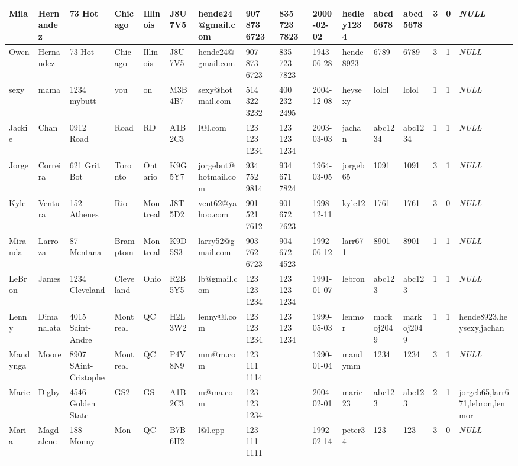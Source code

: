 \begin{longtable}{|l|l|l|l|l|l|l|l|l|l|l|l|l|l|l|l|}
Mila & Hernandez & 73 Hot & Chicago & Illinois & J8U 7V5 & hende24@gmail.com & 907 873 6723 & 835 723 7823 & 2000-02-02 & hedley1234 & abcd5678 & abcd5678 & 3 & 0 & \textit{NULL} \\ \hline 
Owen & Hernandez & 73 Hot & Chicago & Illinois & J8U 7V5 & hende24@gmail.com & 907 873 6723 & 835 723 7823 & 1943-06-28 & hende8923 & 6789 & 6789 & 3 & 1 & \textit{NULL} \\ \hline 
sexy & mama & 1234 mybutt & you & on & M3B 4B7 & sexy@hotmail.com & 514 322 3232 & 400 232 2495 & 2004-12-08 & heysexy & lolol & lolol & 1 & 1 & \textit{NULL} \\ \hline 
Jackie & Chan & 0912 Road & Road & RD & A1B 2C3 & l@l.com & 123 123 1234 & 123 123 1234 & 2003-03-03 & jachan & abc1234 & abc1234 & 1 & 1 & \textit{NULL} \\ \hline 
Jorge & Correira & 621 Grit Bot & Toronto & Ontario & K9G 5Y7 & jorgebut@hotmail.com & 934 752 9814 & 934 671 7824 & 1964-03-05 & jorgeb65 & 1091 & 1091 & 3 & 1 & \textit{NULL} \\ \hline 
Kyle & Ventura & 152 Athenes & Rio & Montreal & J8T 5D2 & vent62@yahoo.com & 901 521 7612 & 901 672 7623 & 1998-12-11 & kyle12 & 1761 & 1761 & 3 & 0 & \textit{NULL} \\ \hline 
Miranda & Larroza & 87 Mentana & Bramptom & Montreal & K9D 5S3 & larry52@gmail.com & 903 762 6723 & 904 672 4523 & 1992-06-12 & larr671 & 8901 & 8901 & 1 & 1 & \textit{NULL} \\ \hline 
LeBron & James & 1234 Cleveland & Cleveland & Ohio & R2B 5Y5 & lb@gmail.com & 123 123 1234 & 123 123 1234 & 1991-01-07 & lebron & abc123 & abc123 & 1 & 1 & \textit{NULL} \\ \hline 
Lenny & Dimanalata & 4015 Saint-Andre & Montreal & QC & H2L 3W2 & lenny@l.com & 123 123 1234 & 123 123 1234 & 1999-05-03 & lenmor & markoj2049 & markoj2049 & 1 & 1 & hende8923,heysexy,jachan \\ \hline 
Mandynga & Moore & 8907 SAint-Cristophe & Montreal & QC & P4V 8N9 & mm@m.com & 123 111 1114 &  & 1990-01-04 & mandymm & 1234 & 1234 & 3 & 1 & \textit{NULL} \\ \hline 
Marie & Digby & 4546 Golden State & GS2 & GS & A1B 2C3 & m@ma.com & 123 123 1234 &  & 2004-02-01 & marie23 & abc123 & abc123 & 2 & 1 & jorgeb65,larr671,lebron,lenmor \\ \hline 
Maria & Magdalene & 188 Monny & Mon & QC & B7B 6H2 & l@l.cpp & 123 111 1111 &  & 1992-02-14 & peter34 & 123 & 123 & 3 & 0 & \textit{NULL} \\ \hline 

\end{longtable}

